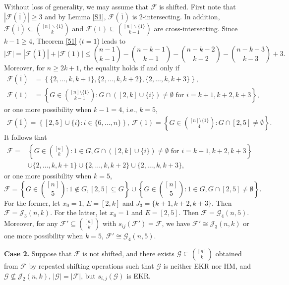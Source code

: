 \documentclass[11pt]{article}
\numberwithin{equation}{section}
\begin{document}
Without loss of generality, we may assume that $\mathcal{F}$ is shifted. 
 First note that $|\mathcal{F}(\bar{1})|\geq 3$ and by Lemma \ref{S1}, $\mathcal{F}(\bar{1})$ is 2-intersecting. In addition, $\mathcal{F}(\bar{1}) \subseteq\binom{[n]\backslash \{1\}}{k}$ and $\mathcal{F}(1) \subseteq\binom{[n]\backslash \{1\}}{k-1}$ are  cross-intersecting. Since $k-1\geq 4$, Theorem \ref{51} ($t=1$) leads to
$$
|\mathcal{F}|=|\mathcal{F}(\bar{1})|+|\mathcal{F}(1)| \leq\binom{n-1}{k-1}-\binom{n-k-1}{k-1}-\binom{n-k-2}{k-2}-\binom{n-k-3}{k-3}+3.
$$
Moreover, for \(n \geq 2k + 1\), the equality holds if and only if
\begin{align*}
\mathcal{F}(\overline{1}) &= \left\{ \{2, \ldots, k, k+1\}, \{2, \ldots, k, k+2\}, \{2, \ldots, k, k+3\} \right\},\\
\mathcal{F}(1) &= \left\{ G \in \binom{[n] \setminus \{1\}}{k-1} : G \cap ([2, k] \cup \{i\}) \neq \emptyset \text{ for } i = k+1, k+2, k+3 \right\},
\end{align*}
or one more possibility when \(k - 1 = 4\), i.e., \(k = 5\),
\begin{align*}
\mathcal{F}(\overline{1}) = \left\{ [2, 5] \cup \{i\} : i \in \{6, \ldots, n\} \right\},\ \mathcal{F}(1) = \left\{ G \in \binom{[n] \setminus \{1\}}{4} : G \cap [2, 5] \neq \emptyset \right\}.
\end{align*}
It follows that
\begin{align*}
\mathcal{F} = &\left\{ G \in \binom{[n]}{k} : 1 \in G, G \cap ([2, k] \cup \{i\}) \neq \emptyset \text{ for } i = k+1, k+2, k+3 \right\} \\
& \cup \{2, \ldots, k, k+1\} \cup \{2, \ldots, k, k+2\} \cup \{2, \ldots, k, k+3\},
\end{align*}
or one more possibility when \(k = 5\),
$$
\mathcal{F} = \left\{ G \in \binom{[n]}{5} : 1 \notin G, [2, 5] \subseteq G \right\} \cup \left\{ G \in \binom{[n]}{5} : 1 \in G, G \cap [2, 5] \neq \emptyset \right\}.
$$
For the former, let \(x_0 = 1\), \(E = [2, k]\) and \(J_3 = \{k+1, k+2, k+3\}\). Then \(\mathcal{F} = \mathcal{J}_3(n, k)\). For the latter, let \(x_0 = 1\) and \(E = [2, 5]\). Then \(\mathcal{F} = \mathcal{G}_4(n, 5)\). Moreover, for any \(\mathcal{F}' \subseteq \binom{[n]}{k}\) with \(s_{ij}(\mathcal{F}') = \mathcal{F}\), we have \(\mathcal{F}' \cong \mathcal{J}_3(n, k)\) or one more possibility when \(k = 5\), \(\mathcal{F}' \cong \mathcal{G}_4(n, 5)\).


{\bf Case 2.}
 Suppose that $\mathcal{F}$ is not shifted, and there exists $\mathcal{G} \subseteq\binom{[n]}{k}$ obtained from $\mathcal{F}$ by repeated shifting operations such that $\mathcal{G}$  is neither EKR nor HM, and  $\mathcal{G} \nsubseteq \mathcal{J}_2(n, k)$, $|\mathcal{G}|=|\mathcal{F}|$, but
$s_{i, j}(\mathcal{G})$ is EKR.
\end{document}
